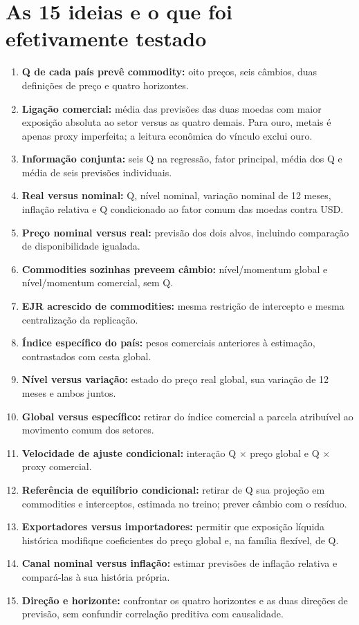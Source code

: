 \documentclass[11pt,a4paper]{article}
\begin{document}
\section*{As 15 ideias e o que foi efetivamente testado}
\begin{enumerate}[leftmargin=1.7em,itemsep=5pt]
\item \textbf{Q de cada país prevê commodity:} oito preços, seis câmbios, duas definições de preço e quatro horizontes.
\item \textbf{Ligação comercial:} média das previsões das duas moedas com maior exposição absoluta ao setor versus as quatro demais. Para ouro, metais é apenas proxy imperfeita; a leitura econômica do vínculo exclui ouro.
\item \textbf{Informação conjunta:} seis Q na regressão, fator principal, média dos Q e média de seis previsões individuais.
\item \textbf{Real versus nominal:} Q, nível nominal, variação nominal de 12 meses, inflação relativa e Q condicionado ao fator comum das moedas contra USD.
\item \textbf{Preço nominal versus real:} previsão dos dois alvos, incluindo comparação de disponibilidade igualada.
\item \textbf{Commodities sozinhas preveem câmbio:} nível/momentum global e nível/momentum comercial, sem Q.
\item \textbf{EJR acrescido de commodities:} mesma restrição de intercepto e mesma centralização da replicação.
\item \textbf{Índice específico do país:} pesos comerciais anteriores à estimação, contrastados com cesta global.
\item \textbf{Nível versus variação:} estado do preço real global, sua variação de 12 meses e ambos juntos.
\item \textbf{Global versus específico:} retirar do índice comercial a parcela atribuível ao movimento comum dos setores.
\item \textbf{Velocidade de ajuste condicional:} interação Q $\times$ preço global e Q $\times$ proxy comercial.
\item \textbf{Referência de equilíbrio condicional:} retirar de Q sua projeção em commodities e interceptos, estimada no treino; prever câmbio com o resíduo.
\item \textbf{Exportadores versus importadores:} permitir que exposição líquida histórica modifique coeficientes do preço global e, na família flexível, de Q.
\item \textbf{Canal nominal versus inflação:} estimar previsões de inflação relativa e compará-las à sua história própria.
\item \textbf{Direção e horizonte:} confrontar os quatro horizontes e as duas direções de previsão, sem confundir correlação preditiva com causalidade.
\end{enumerate}
\end{document}
